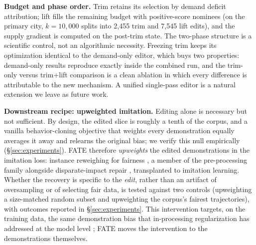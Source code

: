 \textbf{Budget and phase order.} Trim retains its selection by demand
deficit attribution; lift fills the remaining budget with positive-score
nominees
(on the primary city, $k = 10{,}000$ splits into 2{,}455 trim and 7{,}545 lift
edits), and the supply gradient is computed on the post-trim state.
The two-phase structure is a scientific control, not an algorithmic
necessity. Freezing trim keeps its optimization identical to the demand-only
editor, which buys two properties: demand-only results reproduce exactly
inside the combined run, and the trim-only versus trim+lift comparison is a
clean ablation in which every difference is attributable to the new
mechanism. A unified single-pass editor is a natural extension we leave
as future work.

\textbf{Downstream recipe: upweighted imitation.}\label{sec:downstream}
Editing alone is necessary but not sufficient. By design, the edited slice is
roughly a tenth of the corpus, and a vanilla behavior-cloning objective that
weights every demonstration equally averages it away and relearns the original
bias; we verify this null empirically (\S\ref{sec:experiments}).
FATE therefore \emph{upweights} the edited
demonstrations in the imitation loss: instance reweighing for fairness
\cite{kamirancalders2012}, a member of the pre-processing family alongside
disparate-impact repair \cite{feldman2015}, transplanted to imitation
learning. Whether the recovery is specific to the \emph{edit}, rather than an
artifact of oversampling or of selecting fair data, is tested against two
controls (upweighting a size-matched random subset and upweighting the
corpus's fairest trajectories), with outcomes reported in
\S\ref{sec:experiments}. This intervention targets, on the training data, the
same demonstration bias that in-processing regularization has addressed at the
model level \cite{zheng2023}; FATE moves the intervention to the
demonstrations themselves.
